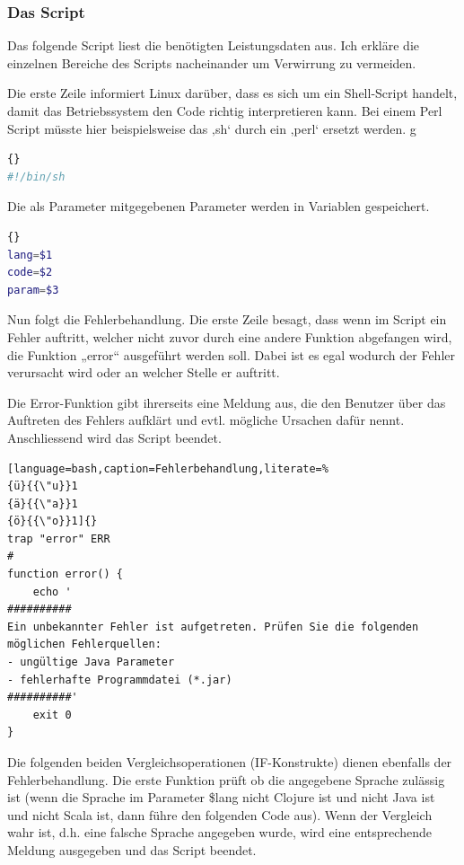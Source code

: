 \documentclass{fancydocument}
\begin{document}
\subsubsection{Das Script}
Das folgende Script liest die benötigten Leistungsdaten aus. Ich erkläre die einzelnen Bereiche des Scripts nacheinander um Verwirrung zu vermeiden.

Die erste Zeile informiert Linux darüber, dass es sich um ein Shell-Script handelt, damit das Betriebssystem den Code richtig interpretieren kann. Bei einem Perl Script müsste hier beispielsweise das ‚sh‘ durch ein ‚perl‘ ersetzt werden.
g
\begin{minipage}{\textwidth}
\begin{lstlisting}[language=bash,caption=Shebang]{}
#!/bin/sh
\end{lstlisting}
\end{minipage}
Die als Parameter mitgegebenen Parameter werden in Variablen gespeichert.

\begin{minipage}{\textwidth}
\begin{lstlisting}[language=bash,caption=Parameter]{}
lang=$1
code=$2
param=$3
\end{lstlisting}
\end{minipage}

Nun folgt die Fehlerbehandlung.  Die erste Zeile besagt, dass wenn im Script ein Fehler auftritt, welcher nicht zuvor durch eine andere Funktion abgefangen wird, die Funktion „error“ ausgeführt werden soll. Dabei ist es egal wodurch der Fehler verursacht wird oder an welcher Stelle er auftritt.

Die Error-Funktion gibt ihrerseits eine Meldung aus, die den Benutzer über das Auftreten des Fehlers aufklärt und evtl. mögliche Ursachen dafür nennt. Anschliessend wird das Script beendet.

\begin{minipage}{\textwidth}
\begin{lstlisting}[language=bash,caption=Fehlerbehandlung,literate=% 
{ü}{{\"u}}1 
{ä}{{\"a}}1 
{ö}{{\"o}}1]{}
trap "error" ERR
#
function error() {
	echo '
##########
Ein unbekannter Fehler ist aufgetreten. Prüfen Sie die folgenden möglichen Fehlerquellen:
- ungültige Java Parameter
- fehlerhafte Programmdatei (*.jar)
##########'
	exit 0
}
\end{lstlisting}
\end{minipage}

Die folgenden beiden Vergleichsoperationen (IF-Konstrukte) dienen ebenfalls der Fehlerbehandlung. Die erste Funktion prüft ob die angegebene Sprache zulässig ist (wenn die Sprache im Parameter \$lang nicht Clojure ist und nicht Java ist und nicht Scala ist, dann führe den folgenden Code aus). Wenn der Vergleich wahr ist, d.h. eine falsche Sprache angegeben wurde, wird eine entsprechende Meldung ausgegeben und das Script beendet.
\end{document}
